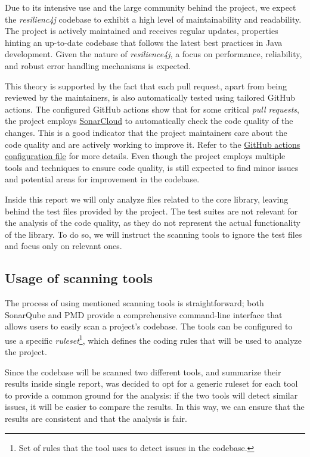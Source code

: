 Due to its intensive use and the large community behind the project, we expect the \textit{resilienc4j} codebase to exhibit a high level of maintainability and readability. The project is actively maintained and receives regular updates, properties hinting an up-to-date codebase that follows the latest best practices in Java development. Given the nature of \textit{resilience4j}, a focus on performance, reliability, and robust error handling mechanisms is expected.

This theory is supported by the fact that each pull request, apart from being reviewed by the maintainers, is also automatically tested using tailored GitHub actions. The configured GitHub actions show that for some critical \textit{pull requests}, the project employs \href{https://sonarcloud.io/}{SonarCloud} to automatically check the code quality of the changes. This is a good indicator that the project maintainers care about the code quality and are actively working to improve it. Refer to the \href{https://github.com/resilience4j/resilience4j/blob/master/.github/workflows/gradle-build.yml#L54}{GitHub actions configuration file} for more details. Even though the project employs multiple tools and techniques to ensure code quality, is still expected to find minor issues and potential areas for improvement in the codebase.

Inside this report we will only analyze files related to the core library, leaving behind the test files provided by the project. The test suites are not relevant for the analysis of the code quality, as they do not represent the actual functionality of the library. To do so, we will instruct the scanning tools to ignore the test files and focus only on relevant ones.

\subsection{Usage of scanning tools}

The process of using mentioned scanning tools is straightforward; both SonarQube and PMD provide a comprehensive command-line interface that allows users to easily scan a project's codebase. The tools can be configured to use a specific \textit{ruleset}\footnote{Set of rules that the tool uses to detect issues in the codebase.}, which defines the coding rules that will be used to analyze the project.

Since the codebase will be scanned two different tools, and summarize their results inside single report, was decided to opt for a generic ruleset for each tool to provide a common ground for the analysis: if the two tools will detect similar issues, it will be easier to compare the results. In this way, we can ensure that the results are consistent and that the analysis is fair.

